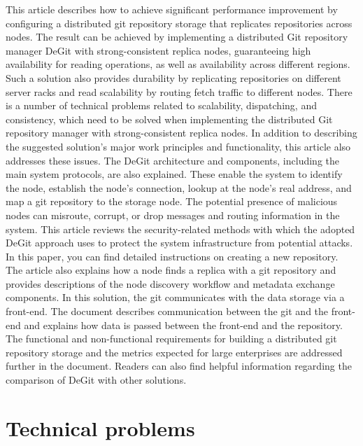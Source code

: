 \documentclass[acmlarge, screen, nonacm, 11pt]{acmart}
\begin{document}
This article describes how to achieve significant performance improvement
by configuring a distributed git repository storage that replicates
repositories across nodes. The result can be achieved by implementing
a distributed Git repository manager DeGit with strong-consistent replica
nodes, guaranteeing high availability for reading operations,
as well as availability across different regions.
Such a solution also provides durability by replicating repositories
on different server racks and read scalability by routing fetch traffic
to different nodes.
There is a number of technical problems related to scalability,
dispatching, and consistency, which need to be solved when implementing
the distributed Git repository manager with strong-consistent replica nodes.
In addition to describing the suggested solution's major work principles
and functionality, this article also addresses these issues.
The DeGit architecture and components, including the main system protocols, are also explained.
These enable the system to identify the node, establish the node's connection,
lookup at the node's real address, and map a git repository to the
storage node.
The potential presence of malicious nodes can misroute, corrupt,
or drop messages and routing information in the system.
This article reviews the security-related methods with which the adopted DeGit approach
uses to protect the system infrastructure from potential attacks.
In this paper, you can find detailed instructions on creating a new repository.
The article also explains how a node finds a replica with a git repository
and provides descriptions of the node discovery workflow and metadata
exchange components.
In this solution, the git communicates with the data storage via a front-end.
The document describes communication between the git and the front-end
and explains how data is passed between the front-end and the repository.
The functional and non-functional requirements for building a distributed
git repository storage and the metrics expected for large enterprises
are addressed further in the document. Readers can also find helpful
information regarding the comparison of DeGit with other solutions.

\section{Technical problems}\label{sec:technical-problems}
\end{document}
